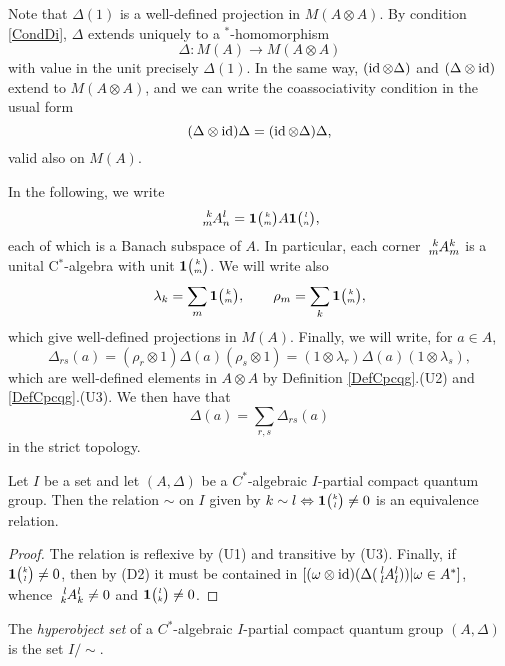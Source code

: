 Note that $\Delta(1)$ is a well-defined projection in $M(A\otimes A)$. By condition \eqref{CondDi}, $\Delta$ extends uniquely to a $^*$-homomorphism \[\Delta: M(A)\rightarrow M(A\otimes A)\] with value in the unit precisely $\Delta(1)$. In the same way, $(\operatorname{id}\otimes \Delta)$ and $(\Delta\otimes \operatorname{id})$ extend to $M(A\otimes A)$, and we can write the coassociativity condition in the usual form \[(\Delta\otimes \operatorname{id})\Delta = (\operatorname{id}\otimes \Delta)\Delta,\] valid also on $M(A)$.

In the following, we write \[\Gr{A}{k}{l}{m}{n} = \UnitC{k}{m}A\UnitC{l}{n},\] each of which is a Banach subspace of $A$. In particular, each corner $\Gr{A}{k}{k}{m}{m}$ is a unital C$^*$-algebra with unit $\mathbf{1}{\tiny {\begin{pmatrix} k\\m\end{pmatrix}}}$. We will write also \[\lambda_k = \sum_{m}\mathbf{1}{\tiny {\begin{pmatrix} k\\m\end{pmatrix}}},\qquad \rho_m = \sum_{k}\mathbf{1}{\tiny {\begin{pmatrix} k\\m\end{pmatrix}}},\] which give well-defined projections in $M(A)$. Finally, we will write, for $a\in A$, \[\Delta_{rs}(a) = (\rho_r\otimes 1)\Delta(a)(\rho_s\otimes 1) = (1\otimes \lambda_r)\Delta(a)(1\otimes \lambda_s),\] which are well-defined elements in $A\otimes A$ by Definition \ref{DefCpcqg}.(U2) and \ref{DefCpcqg}.(U3). We then have that  \[\Delta(a) = \sum_{r,s} \Delta_{rs}(a)\] in the strict topology. 

\begin{Lem}\label{LemEqRel}
Let $I$ be a set and let $(A,\Delta)$   be a $C^{*}$-algebraic $I$-partial compact quantum group. Then the relation $\sim$ on $I$ given by $k\sim l \Leftrightarrow \mathbf{1}{\tiny {\begin{pmatrix} k\\l\end{pmatrix}}}\neq 0$ is an equivalence relation.
\end{Lem}
\begin{proof}
  The relation is reflexive by (U1) and transitive by (U3). Finally, if $\mathbf{1}{\tiny {\begin{pmatrix} k\\l\end{pmatrix}}}\neq 0$, then by (D2) it must be contained in $[(\omega \otimes \id)(\Delta(\Gr{A}{l}{l}{l}{l})) | \omega \in A^{*}]$, whence $\Gr{A}{l}{l}{k}{k}\neq 0$ and $\mathbf{1}{\tiny {\begin{pmatrix} l\\k\end{pmatrix}}} \neq 0$.
\end{proof}
\begin{Def}
  The \emph{hyperobject set} of a   $C^{*}$-algebraic $I$-partial compact quantum group $(A,\Delta)$ is the set $I/\sim$.
\end{Def}

